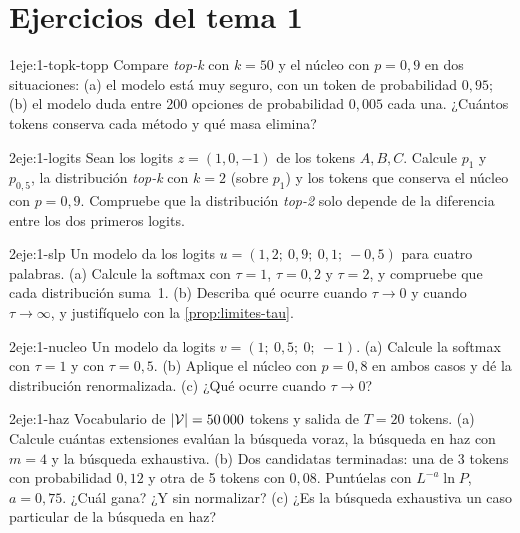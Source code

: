 \section*{Ejercicios del tema 1}

\begin{ejercicio}{1}{eje:1-topk-topp}
Compare \emph{top-k} con $k=50$ y el núcleo con $p=0{,}9$ en dos situaciones: (a) el modelo está muy seguro, con un token de probabilidad $0{,}95$; (b) el modelo duda entre 200 opciones de probabilidad $0{,}005$ cada una. ¿Cuántos tokens conserva cada método y qué masa elimina?
\end{ejercicio}

\begin{ejercicio}{2}{eje:1-logits}
Sean los logits $z=(1,0,-1)$ de los tokens $A,B,C$. Calcule $p_1$ y $p_{0{,}5}$, la distribución \emph{top-k} con $k=2$ (sobre $p_1$) y los tokens que conserva el núcleo con $p=0{,}9$. Compruebe que la distribución \emph{top-2} solo depende de la diferencia entre los dos primeros logits.
\end{ejercicio}

\begin{ejercicio}{2}{eje:1-slp}
Un modelo da los logits $u=(1{,}2;\allowbreak\ 0{,}9;\allowbreak\ 0{,}1;\allowbreak\ -0{,}5)$ para cuatro palabras. (a) Calcule la softmax con $\tau=1$, $\tau=0{,}2$ y $\tau=2$, y compruebe que cada distribución suma~1. (b) Describa qué ocurre cuando $\tau\to 0$ y cuando $\tau\to\infty$, y justifíquelo con la \cref{prop:limites-tau}.
\end{ejercicio}

\begin{ejercicio}{2}{eje:1-nucleo}
Un modelo da logits $v=(1;\allowbreak\ 0{,}5;\allowbreak\ 0;\allowbreak\ -1)$. (a) Calcule la softmax con $\tau=1$ y con $\tau=0{,}5$. (b) Aplique el núcleo con $p=0{,}8$ en ambos casos y dé la distribución renormalizada. (c) ¿Qué ocurre cuando $\tau\to 0$?
\end{ejercicio}

\begin{ejercicio}{2}{eje:1-haz}
Vocabulario de $\lvert\mathcal{V}\rvert=50\,000$ tokens y salida de $T=20$ tokens. (a) Calcule cuántas extensiones evalúan la búsqueda voraz, la búsqueda en haz con $m=4$ y la búsqueda exhaustiva. (b) Dos candidatas terminadas: una de 3 tokens con probabilidad $0{,}12$ y otra de 5 tokens con $0{,}08$. Puntúelas con $L^{-a}\ln P$, $a=0{,}75$. ¿Cuál gana? ¿Y sin normalizar? (c) ¿Es la búsqueda exhaustiva un caso particular de la búsqueda en haz?
\end{ejercicio}

